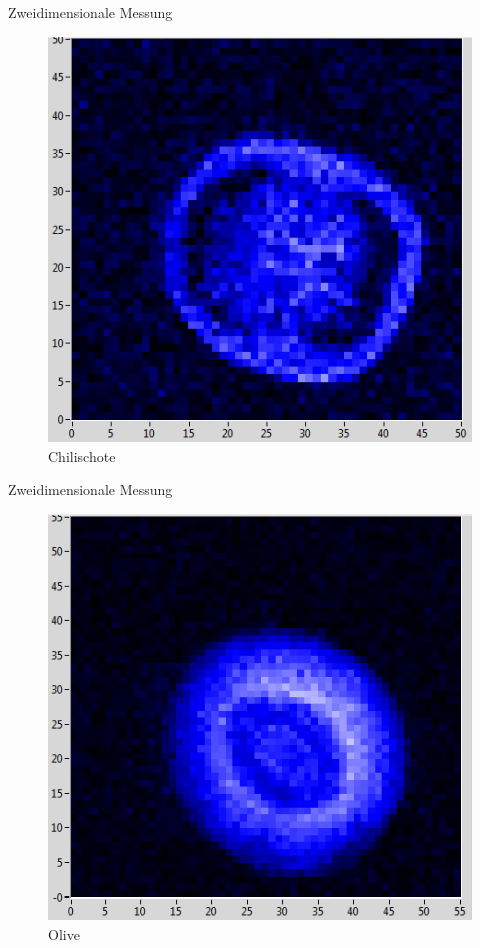 \begin{frame}{Zweidimensionale Messung}
	\begin{figure}
	\centering
	\includegraphics[scale=.5]{..//figures//chilipepper.png}
	\caption{Chilischote}
	\end{figure}
\end{frame}

\begin{frame}{Zweidimensionale Messung}
	\begin{figure}
	\centering
	\includegraphics[scale=.5]{..//figures//olive.png}
	\caption{Olive}
	\end{figure}
\end{frame}


